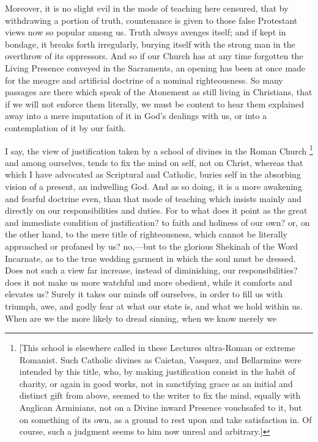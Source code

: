 Moreover, it is no slight evil in the mode of teaching here
censured, that by withdrawing a portion of truth, countenance is given
to those false Protestant views now so popular among us. Truth always
avenges itself; and if kept in bondage, it breaks forth irregularly,
burying itself with the strong man in the overthrow of its oppressors.
And so if our Church has at any time forgotten the Living Presence
conveyed in the Sacraments, an opening has been at once made for the
meagre and artificial doctrine of a nominal righteousness. So many
passages are there which speak of the Atonement as still living in
Christians, that if we will not enforce them literally, we must
be content to hear them explained away into a mere imputation of it in
God's dealings with us, or into a contemplation of it by our faith.

I say, the view of justification taken by a school of divines in
the Roman Church \footnote{[This school is
elsewhere called in these Lectures ultra-Roman or extreme Romanist.
Such Catholic divines as Caietan, Vasquez, and Bellarmine were
intended by this title, who, by making justification consist in the
habit of charity, or again in good works, not in sanctifying grace as
an initial and distinct gift from above, seemed to the writer to fix
the mind, equally with Anglican Arminians, not on a Divine inward
Presence vouchsafed to it, but on something of its own, as a ground to
rest upon and take satisfaction in. Of course, such a judgment seems
to him now unreal and arbitrary.]} and
among ourselves, tends to fix the mind on self, not on Christ, whereas
that which I have advocated as Scriptural and Catholic, buries self in
the absorbing vision of a present, an indwelling God. And as so doing,
it is a more awakening and fearful doctrine even, than that mode of
teaching which insists mainly and directly on our responsibilities and
duties. For to what does it point as the great and immediate condition
of justification? to faith and holiness of our own? or, on the other
hand, to the mere title of righteousness, which cannot be literally
approached or profaned by us? no,—but to the glorious Shekinah of
the Word Incarnate, as to the true wedding garment in which the soul
must be dressed. Does not such a view far increase, instead of
diminishing, our responsibilities? does it not make us more watchful
and more obedient, while it comforts and elevates us? Surely it takes
our minds off ourselves, in order to fill us with triumph, awe, and
godly fear at what our state is, and what we hold within us.
When are we the more likely to dread sinning, when we know merely we
